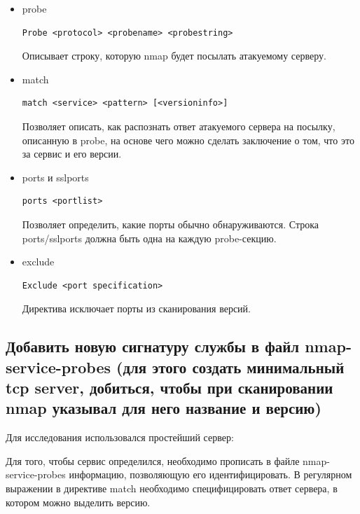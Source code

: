 \documentclass[a4paper]{article}
\begin{document}
\begin{itemize}

\item probe
\begin{verbatim}
Probe <protocol> <probename> <probestring>
\end{verbatim}

Описывает строку, которую nmap будет посылать атакуемому серверу.

\item match
\begin{verbatim}
match <service> <pattern> [<versioninfo>]
\end{verbatim}

Позволяет описать, как распознать ответ атакуемого сервера на посылку, описанную в probe, на основе чего можно сделать заключение о том, что это за сервис и его версии.

\item ports и sslports
\begin{verbatim}
ports <portlist>
\end{verbatim}

Позволяет определить, какие порты обычно обнаруживаются. Строка ports/sslports должна быть одна на каждую probe-секцию.

\item exclude
\begin{verbatim}
Exclude <port specification>
\end{verbatim}

Директива исключает порты из сканирования версий.

\end{itemize}



\subsection{Добавить новую сигнатуру службы в файл nmap-service-probes (для этого создать минимальный tcp server, добиться, чтобы при сканировании nmap указывал для него название и версию)}

Для исследования использовался простейший сервер:



Для того, чтобы сервис определился, необходимо прописать в файле nmap-service-probes информацию, позволяющую его идентифицировать. В регулярном выражении в директиве match необходимо специфицировать ответ сервера, в котором можно выделить версию.
\end{document}
